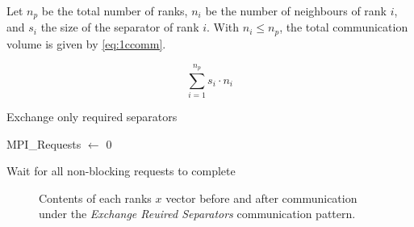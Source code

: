 Let \(n_{p}\) be the total number of ranks, \(n_{i}\) be the number of neighbours of rank \(i\), and \(s_{i}\) the size of the separator of rank \(i\). With \(n_{i} \leq n_{p}\), the total communication volume is given by \ref{eq:1ccomm}.

\begin{equation}
    \label{eq:1ccomm}
    \sum_{i=1}^{n_{p}} s_i \cdot  n_{i} 
\end{equation}

\begin{algorithm}[H]
    \label{alg:1ccomm}
    \caption{Exchange only required separators}
    \SetAlgoVlined
    \Output{\newline}

    MPI\_Requests \(\gets\) 0\\
 

    Wait for all non-blocking requests to complete\\
\end{algorithm}


\begin{figure}[H]
    \centering
    \caption{Contents of each ranks \(x\) vector before and after communication under the \textit{Exchange Reuired Separators} communication pattern.}
    \label{fig:1ccomm}
\end{figure}

